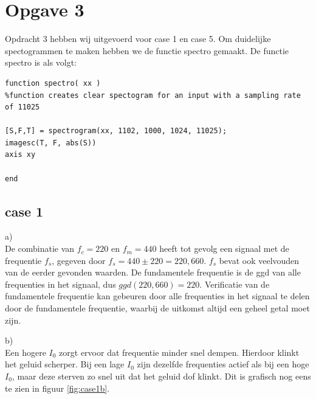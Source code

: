 \documentclass{article}
\begin{document}
\section{Opgave 3}
Opdracht 3 hebben wij uitgevoerd voor case 1 en case 5. Om duidelijke spectogrammen te maken hebben we de functie spectro gemaakt. De functie spectro is als volgt:

\begin{lstlisting}
function spectro( xx )
%function creates clear spectogram for an input with a sampling rate of 11025

[S,F,T] = spectrogram(xx, 1102, 1000, 1024, 11025);
imagesc(T, F, abs(S))
axis xy

end
\end{lstlisting}

\subsection{case 1}
a)\\
De combinatie van $f_c = 220$ en $f_m = 440$ heeft tot gevolg een signaal met de frequentie $f_s$, gegeven door $f_s = 440 \pm 220 = {220, 660}$. $f_s$ bevat ook veelvouden van de eerder gevonden waarden. De fundamentele frequentie is de ggd van alle frequenties in het signaal, dus $ggd(220, 660) = 220$. Verificatie van de fundamentele frequentie kan gebeuren door alle frequenties in het signaal te delen door de fundamentele frequentie, waarbij de uitkomst altijd een geheel getal moet zijn.

b)\\
Een hogere $I_0$ zorgt ervoor dat frequentie minder snel dempen. Hierdoor klinkt het geluid scherper. Bij een lage $I_0$ zijn dezelfde frequenties actief als bij een hoge $I_0$, maar deze sterven zo snel uit dat het geluid dof klinkt. Dit is grafisch nog eens te zien in figuur \ref{fig:case1b}.
\end{document}
